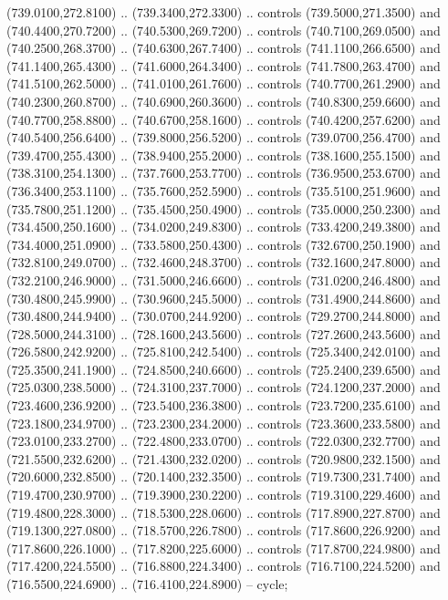 {\begin{scope}[y=0.80pt, x=0.80pt, yscale=-1, xscale=1, inner sep=0pt, outer sep=0pt, #1]
      (739.0100,272.8100) .. (739.3400,272.3300) .. controls (739.5000,271.3500) and
      (740.4400,270.7200) .. (740.5300,269.7200) .. controls (740.7100,269.0500) and
      (740.2500,268.3700) .. (740.6300,267.7400) .. controls (741.1100,266.6500) and
      (741.1400,265.4300) .. (741.6000,264.3400) .. controls (741.7800,263.4700) and
      (741.5100,262.5000) .. (741.0100,261.7600) .. controls (740.7700,261.2900) and
      (740.2300,260.8700) .. (740.6900,260.3600) .. controls (740.8300,259.6600) and
      (740.7700,258.8800) .. (740.6700,258.1600) .. controls (740.4200,257.6200) and
      (740.5400,256.6400) .. (739.8000,256.5200) .. controls (739.0700,256.4700) and
      (739.4700,255.4300) .. (738.9400,255.2000) .. controls (738.1600,255.1500) and
      (738.3100,254.1300) .. (737.7600,253.7700) .. controls (736.9500,253.6700) and
      (736.3400,253.1100) .. (735.7600,252.5900) .. controls (735.5100,251.9600) and
      (735.7800,251.1200) .. (735.4500,250.4900) .. controls (735.0000,250.2300) and
      (734.4500,250.1600) .. (734.0200,249.8300) .. controls (733.4200,249.3800) and
      (734.4000,251.0900) .. (733.5800,250.4300) .. controls (732.6700,250.1900) and
      (732.8100,249.0700) .. (732.4600,248.3700) .. controls (732.1600,247.8000) and
      (732.2100,246.9000) .. (731.5000,246.6600) .. controls (731.0200,246.4800) and
      (730.4800,245.9900) .. (730.9600,245.5000) .. controls (731.4900,244.8600) and
      (730.4800,244.9400) .. (730.0700,244.9200) .. controls (729.2700,244.8000) and
      (728.5000,244.3100) .. (728.1600,243.5600) .. controls (727.2600,243.5600) and
      (726.5800,242.9200) .. (725.8100,242.5400) .. controls (725.3400,242.0100) and
      (725.3500,241.1900) .. (724.8500,240.6600) .. controls (725.2400,239.6500) and
      (725.0300,238.5000) .. (724.3100,237.7000) .. controls (724.1200,237.2000) and
      (723.4600,236.9200) .. (723.5400,236.3800) .. controls (723.7200,235.6100) and
      (723.1800,234.9700) .. (723.2300,234.2000) .. controls (723.3600,233.5800) and
      (723.0100,233.2700) .. (722.4800,233.0700) .. controls (722.0300,232.7700) and
      (721.5500,232.6200) .. (721.4300,232.0200) .. controls (720.9800,232.1500) and
      (720.6000,232.8500) .. (720.1400,232.3500) .. controls (719.7300,231.7400) and
      (719.4700,230.9700) .. (719.3900,230.2200) .. controls (719.3100,229.4600) and
      (719.4800,228.3000) .. (718.5300,228.0600) .. controls (717.8900,227.8700) and
      (719.1300,227.0800) .. (718.5700,226.7800) .. controls (717.8600,226.9200) and
      (717.8600,226.1000) .. (717.8200,225.6000) .. controls (717.8700,224.9800) and
      (717.4200,224.5500) .. (716.8800,224.3400) .. controls (716.7100,224.5200) and
      (716.5500,224.6900) .. (716.4100,224.8900) -- cycle;


\end{scope}}

